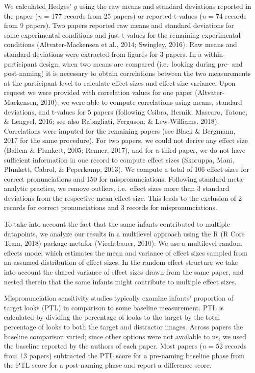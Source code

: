\documentclass[man]{apa6}
\theoremstyle{definition}
\theoremstyle{definition}
\theoremstyle{definition}
\theoremstyle{remark}
\begin{document}
We calculated Hedges' \emph{g} using the raw means and standard
deviations reported in the paper (\emph{n} = 177 records from 25 papers)
or reported t-values (\emph{n} = 74 records from 9 papers). Two papers
reported raw means and standard deviations for some experimental
conditions and just t-values for the remaining experimental conditions
(Altvater-Mackensen et al., 2014; Swingley, 2016). Raw means and
standard deviations were extracted from figures for 3 papers. In a
within-participant design, when two means are compared (i.e.~looking
during pre- and post-naming) it is necessary to obtain correlations
between the two measurements at the participant level to calculate
effect sizes and effect size variance. Upon request we were provided
with correlation values for one paper (Altvater-Mackensen, 2010); we
were able to compute correlations using means, standard deviations, and
t-values for 5 papers (following Csibra, Hernik, Mascaro, Tatone, \&
Lengyel, 2016; see also Rabagliati, Ferguson, \& Lew-Williams, 2018).
Correlations were imputed for the remaining papers (see Black \&
Bergmann, 2017 for the same procedure). For two papers, we could not
derive any effect size (Ballem \& Plunkett, 2005; Renner, 2017), and for
a third paper, we do not have sufficient information in one record to
compute effect sizes (Skoruppa, Mani, Plunkett, Cabrol, \& Peperkamp,
2013). We compute a total of 106 effect sizes for correct pronunciations
and 150 for mispronunciations. Following standard meta-analytic
practice, we remove outliers, i.e.~effect sizes more than 3 standard
deviations from the respective mean effect size. This leads to the
exclusion of 2 records for correct pronunciations and 3 records for
mispronunciations.

To take into account the fact that the same infants contributed to
multiple datapoints, we analyze our results in a multilevel approach
using the R (R Core Team, 2018) package metafor (Viechtbauer, 2010). We
use a multilevel random effects model which estimates the mean and
variance of effect sizes sampled from an assumed distribution of effect
sizes. In the random effect structure we take into account the shared
variance of effect sizes drawn from the same paper, and nested therein
that the same infants might contribute to multiple effect sizes.

Mispronunciation sensitivity studies typically examine infants'
proportion of target looks (PTL) in comparison to some baseline
measurement. PTL is calculated by dividing the percentage of looks to
the target by the total percentage of looks to both the target and
distractor images. Across papers the baseline comparison varied; since
other options were not available to us, we used the baseline reported by
the authors of each paper. Most papers (\emph{n} = 52 records from 13
papers) subtracted the PTL score for a pre-naming baseline phase from
the PTL score for a post-naming phase and report a difference score.
\end{document}
